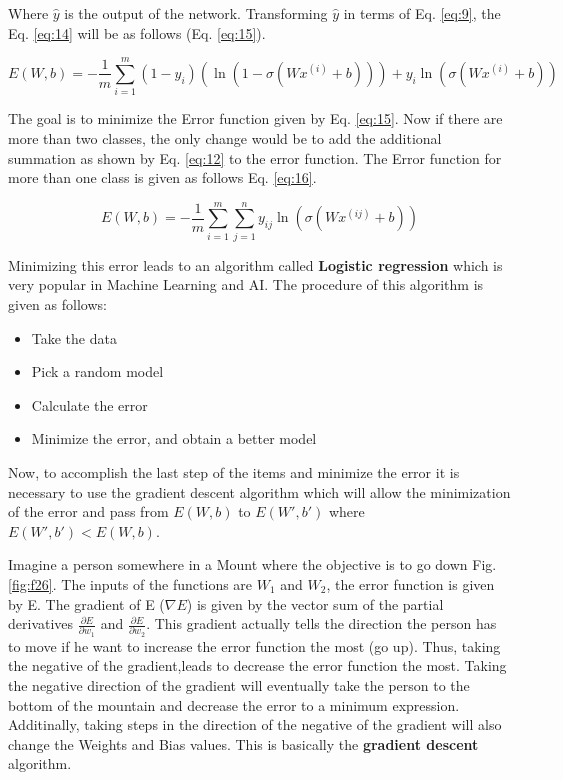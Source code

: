 \documentclass{article}
\begin{document}
Where \(\hat{y}\) is the output of the network. Transforming \(\hat{y}\) in terms of Eq. \eqref{eq:9}, the Eq. \eqref{eq:14} will be as follows (Eq. \eqref{eq:15}).

\begin{equation}
\label{eq:15}
E(W,b) = - \frac{1}{m} \sum_{i=1}^m (1 - y_i) (\ln{(1 - \sigma(Wx^{(i)} + b))}) + y_i\ln{(\sigma(Wx^{(i)} + b))}
\end{equation} 

The goal is to minimize the Error function given by Eq. \eqref{eq:15}. Now if there are more than two classes, the only change would be to add the additional summation as shown by Eq. \eqref{eq:12} to the error function. The Error function for more than one class is given as follows Eq. \eqref{eq:16}.

\begin{equation}
\label{eq:16}
E(W,b) = - \frac{1}{m} \sum_{i=1}^m \sum_{j=1}^n y_{ij}\ln{(\sigma(Wx^{(ij)} + b))} 
\end{equation} 

Minimizing this error leads to an algorithm called \textbf{Logistic regression } which is very popular in Machine Learning and AI. The procedure of this algorithm is given as follows:

\begin{itemize}
  \item Take the data
  \item Pick a random model
  \item Calculate the error
  \item Minimize the error, and obtain a better model
\end{itemize}

Now, to accomplish the last step of the items and minimize the error it is necessary to use the gradient descent algorithm which will allow the minimization of the error and pass from \(E(W,b)\) to \(E(W',b')\) where \(E(W',b') < E(W,b)\).

Imagine a person somewhere in a Mount where the objective is to go down Fig. \ref{fig:f26}. The inputs of the functions are \(W_1\) and \(W_2\), the error function is given by E. The gradient of E (\(\nabla E\)) is given by the vector sum of the partial derivatives \(\frac{\partial E}{\partial w_1}\) and \(\frac{\partial E}{\partial w_2}\). This gradient actually tells the direction the person has to move if he want to increase the error function the most (go up). Thus, taking the negative of the gradient,leads to decrease the error function the most. Taking the negative direction of the gradient will eventually take the person to the bottom of the mountain and decrease the error to a minimum expression. Additinally, taking steps in the direction of the negative of the gradient will also change the Weights and Bias values. This is basically the \textbf{gradient descent} algorithm. 
\end{document}
